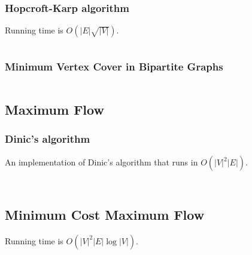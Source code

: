\documentclass[8pt,a4paper,landscape,oneside]{amsart}
\newcommand{\code}[1]{\inputminted[fontsize=\normalsize,baselinestretch=1]{cpp}{_code/#1}}
\newif\ifverbose
\begin{document}
\begin{multicols*}{3}
        \subsubsection{Hopcroft-Karp algorithm}
            \ifverbose
            An implementation of Hopcroft-Karp algorithm for bipartite
            matching.
            \fi
            Running time is $O(|E|\sqrt{|V|})$.
            \code{graph/hopcroft_karp.cpp}

        \subsubsection{Minimum Vertex Cover in Bipartite Graphs}
            \code{graph/bipartite_mvc.cpp}

    \subsection{Maximum Flow}
        \subsubsection{Dinic's algorithm}
            An implementation of Dinic's algorithm that runs in
            $O(|V|^2|E|)$.
            \ifverbose
            It computes the maximum flow of a flow network.
            \fi
            \code{graph/dinic.cpp}

        \ifverbose
        \subsubsection{Edmonds Karp's algorithm}
            An implementation of Edmonds Karp's algorithm that runs in
            $O(|V||E|^2)$.
            \ifverbose
            It computes the maximum flow of a flow network.
            \fi
            \code{graph/edmonds_karps.cpp}
        \fi

    \subsection{Minimum Cost Maximum Flow}
        \ifverbose
        An implementation of Edmonds Karp's algorithm, modified to find
        shortest path to augment each time (instead of just any path). It
        computes the maximum flow of a flow network, and when there are
        multiple maximum flows, finds the maximum flow with minimum cost.
        \fi
        Running time is $O(|V|^2|E|\log|V|)$.
        \code{graph/edmonds_karps_mcmf.cpp}


\end{multicols*}
\end{document}
